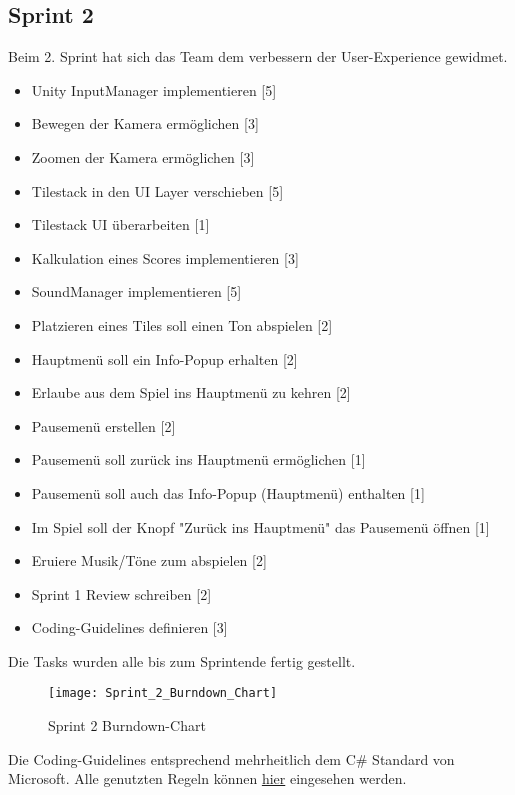 \documentclass[../main.tex]{subfiles}
\begin{document}
	\newpage
	\subsection{Sprint 2}
	
	\par Beim 2. Sprint hat sich das Team dem verbessern der User-Experience gewidmet.
	
	\begin{itemize}
		\item Unity InputManager implementieren [5]
		\item Bewegen der Kamera ermöglichen [3]
		\item Zoomen der Kamera ermöglichen [3]
		\item Tilestack in den UI Layer verschieben [5]
		\item Tilestack UI überarbeiten [1]
		\item Kalkulation eines Scores implementieren [3]
		\item SoundManager implementieren [5]
		\item Platzieren eines Tiles soll einen Ton abspielen [2]
		\item Hauptmenü soll ein Info-Popup erhalten [2]
		\item Erlaube aus dem Spiel ins Hauptmenü zu kehren [2]
		\item Pausemenü erstellen [2]
		\item Pausemenü soll zurück ins Hauptmenü ermöglichen [1]
		\item Pausemenü soll auch das Info-Popup (Hauptmenü) enthalten [1]
		\item Im Spiel soll der Knopf "Zurück ins Hauptmenü" das Pausemenü öffnen [1]
		\item Eruiere Musik/Töne zum abspielen [2]
		\item Sprint 1 Review schreiben [2]
		\item Coding-Guidelines definieren [3]
		
	\end{itemize} 

	\par Die Tasks wurden alle bis zum Sprintende fertig gestellt.
	
	\begin{figure}[H]
		\centering
		\texttt{[image: Sprint\_2\_Burndown\_Chart]}
		\caption{Sprint 2 Burndown-Chart}
	\end{figure}

	\par Die Coding-Guidelines entsprechend mehrheitlich dem C\# Standard von Microsoft. Alle genutzten Regeln können \href{https://github.com/ktaranov/naming-convention/blob/master/C#Coding Standards and Naming Conventions.md}{hier} eingesehen werden.
\end{document}
